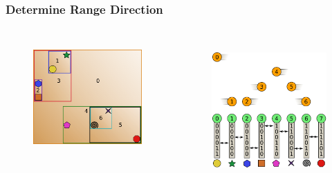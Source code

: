 \documentclass{beamer}
\begin{document}
\begin{frame}
  \frametitle{Determine Range Direction}
  
\begin{columns}[t]

\begin{figure}
\includegraphics[height=45mm]{primitive-box.png}
\end{figure}

\begin{figure}
\includegraphics[height=55mm]{algo_1.png}
\end{figure}
\end{columns}
\end{frame}
\end{document}
